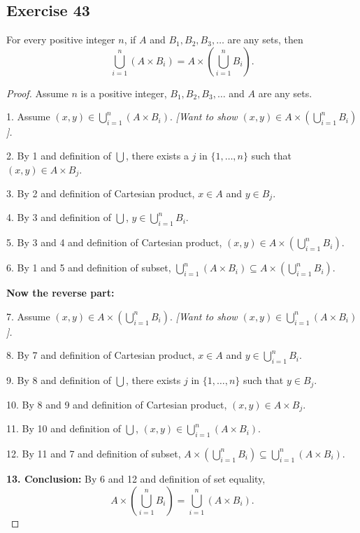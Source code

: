 \documentclass[14pt]{extarticle}
\newcommand{\dps}{\displaystyle}
\begin{document}
\subsection{Exercise 43}
For every positive integer $n$, if $A$ and \(B_1, B_2, B_3, \ldots\) are any sets, then
\[
  \bigcup_{i=1}^n (A \times B_i) = A \times \left( \bigcup_{i=1}^n B_i\right).
\]
\begin{proof}
  Assume $n$ is a positive integer, \(B_1, B_2, B_3, \ldots\) and $A$ are any sets.

  1. Assume \(\dps (x,y) \in \bigcup_{i=1}^n (A \times B_i)\). {\it [Want to show \(\dps (x,y) \in A \times \left(
        \bigcup_{i=1}^n B_i\right)\)].}

  2. By 1 and definition of \(\dps \bigcup\), there exists a $j$ in \(\{1, \ldots, n\}\) such that \((x,y) \in A \times B_j\).

  3. By 2 and definition of Cartesian product, \(x \in A\) and \(y \in B_j\).

  4. By 3 and definition of $\dps \bigcup$, \(\dps y \in \bigcup_{i=1}^n B_i\).

  5. By 3 and 4 and definition of Cartesian product, \(\dps (x,y) \in A \times \left(\bigcup_{i=1}^n B_i\right)\).

  6. By 1 and 5 and definition of subset, \(\dps \bigcup_ {i=1}^n (A \times B_i) \subseteq A \times \left(
  \bigcup_{i=1}^n B_i\right).\)

  {\bf Now the reverse part:}

  7. Assume \(\dps (x,y) \in A \times \left(\bigcup_{i=1}^n B_i\right)\).
    {\it [Want to show \(\dps (x,y) \in \bigcup_{i=1}^n (A \times B_i)\)].}

  8. By 7 and definition of Cartesian product, \(x \in A \) and \(\dps y \in \bigcup_{i=1}^n B_i\).

  9. By 8 and definition of $\dps \bigcup$, there exists $j$ in \(\{1, \ldots, n\}\) such that \(y \in B_j\).

  10. By 8 and 9 and definition of Cartesian product, \((x,y) \in A \times B_j\).

  11. By 10 and definition of $\dps \bigcup$, \((x, y) \in \dps \bigcup_{i=1}^n (A \times B_i)\).

  12. By 11 and 7 and definition of subset, \(\dps A \times \left(\bigcup_{i=1}^n B_i\right) \subseteq \bigcup_{i=1}^n (A \times B_i)\).

    {\bf 13. Conclusion:} By 6 and 12 and definition of set equality,
  \[
    A \times \left(\bigcup_{i=1}^n B_i\right) = \bigcup_{i=1}^n (A \times B_i).
  \]
\end{proof}
\end{document}
